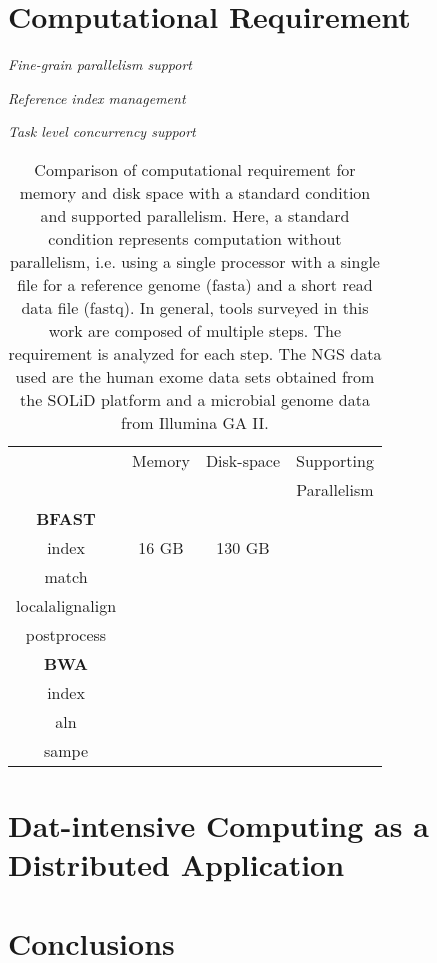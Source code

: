 \documentclass{sig-alternate}
\begin{document}
\section{Computational Requirement}
\textit{Fine-grain parallelism support}



\textit{Reference index management}


\textit{Task level concurrency support}






\begin{table}

\begin{tabular}{|c|c|c|c|}  \hline
  & Memory & Disk-space & Supporting     \\ 
  &  &    & Parallelism \\ \hline 
\textbf{BFAST} &  &  & \\
index  & 16 GB & 130 GB & \\ 
match & &  &  \\ 
localalignalign & & &  \\
postprocess & &  &  \\ \hline
\textbf{BWA} & & & \\
index &  & & \\
aln &  &  & \\
sampe &  &  & \\  \hline


\end{tabular} 
\caption{Comparison of computational requirement for memory and disk space with a standard condition and supported parallelism.  Here, a standard condition represents computation without parallelism, i.e. using a single processor with a single file for a reference genome (fasta) and a short read data file (fastq).   In general, tools surveyed in this work are composed of multiple steps. The requirement is analyzed for each step. The NGS data used are the human exome data sets obtained from the SOLiD platform and a microbial genome data from Illumina GA II.}
 \label{comp-req-bfast} 
\end{table}




\section{Dat-intensive Computing as a Distributed Application}


\section{Conclusions}
\end{document}
